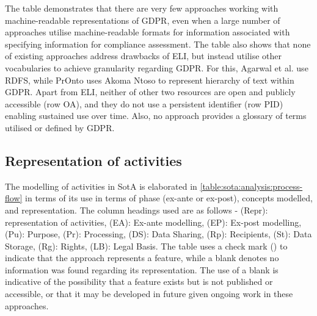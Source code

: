 The table demonstrates that there are very few approaches working with machine-readable representations of GDPR, even when a large number of approaches utilise machine-readable formats for information associated with specifying information for compliance assessment. The table also shows that none of existing approaches address drawbacks of ELI, but instead utilise other vocabularies to achieve granularity regarding GDPR. For this, Agarwal et al. \cite{agarwal_legislative_2018} use RDFS, while PrOnto uses Akoma Ntoso to represent hierarchy of text within GDPR.
Apart from ELI, neither of other two resources are open and publicly accessible (row OA), and they do not use a persistent identifier (row PID) enabling sustained use over time. Also, no approach provides a glossary of terms utilised or defined by GDPR.

\subsection{Representation of activities}\label{sota:analysis:process-flows}
The modelling of activities in SotA is elaborated in \autoref{table:sota:analysis:process-flow} in terms of its use in terms of phase (ex-ante or ex-post), concepts modelled, and representation. The column headings used are as follows - (Repr): representation of activities, (EA): Ex-ante modelling, (EP): Ex-post modelling, (Pu): Purpose, (Pr): Processing, (DS): Data Sharing, (Rp): Recipients, (St): Data Storage, (Rg): Rights, (LB): Legal Basis.
The table uses a check mark (\cmark) to indicate that the approach represents a feature, while a blank denotes no information was found regarding its representation. The use of a blank is indicative of the possibility that a feature exists but is not published or accessible, or that it may be developed in future given ongoing work in these approaches.
